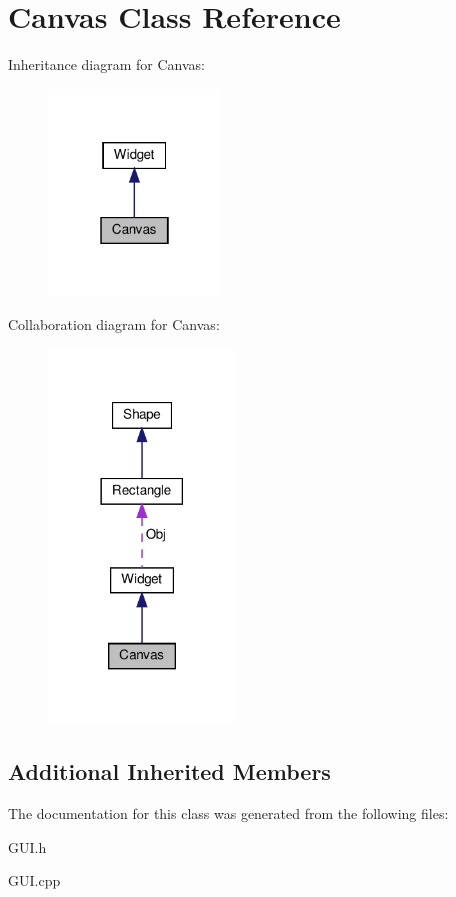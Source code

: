 \hypertarget{classCanvas}{}\section{Canvas Class Reference}
\label{classCanvas}


Inheritance diagram for Canvas\+:\nopagebreak
\begin{figure}[H]
\begin{center}
\leavevmode
\includegraphics[width=130pt]{classCanvas__inherit__graph}
\end{center}
\end{figure}


Collaboration diagram for Canvas\+:\nopagebreak
\begin{figure}[H]
\begin{center}
\leavevmode
\includegraphics[width=141pt]{classCanvas__coll__graph}
\end{center}
\end{figure}
\subsection*{Additional Inherited Members}


The documentation for this class was generated from the following files\+:\begin{DoxyCompactItemize}
\item 
G\+U\+I.\+h\item 
G\+U\+I.\+cpp\end{DoxyCompactItemize}
